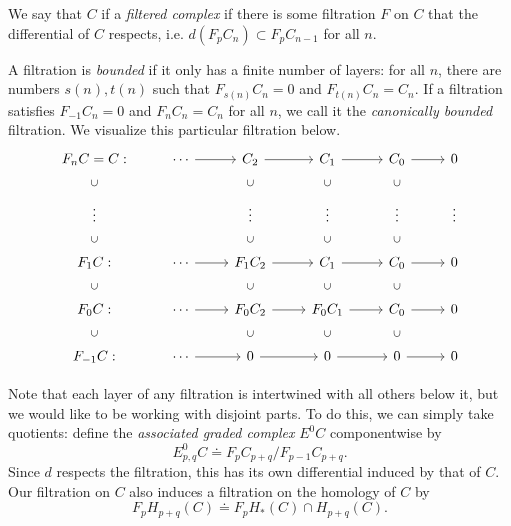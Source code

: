 \documentclass[twoside,10pt]{article}
\begin{document}
\begin{defn}[]
	We say that $C$ if a \textit{filtered complex} if there is some filtration $F$ on $C$ that the differential of $C$ respects, i.e. $d(F_{p}C_{n}) \subset F_{p}C_{n-1}$ for all $n$.
\end{defn}

A filtration is \textit{bounded} if it only has a finite number of layers: for all $n$, there are numbers $s(n), t(n)$ such that $F_{s(n)}C_{n}=0$ and $F_{t(n)}C_{n}=C_{n}$. If a filtration satisfies $F_{-1}C_n=0$ and $F_{n}C_{n}=C_{n}$ for all $n$, we call it the \textit{canonically bounded} filtration. We visualize this particular filtration below.
\[
	\begin{tikzcd}
		F_{n}C = C:&\cdots\arrow[r]&C_{2}\arrow[r]&C_1\arrow[r]&C_{0}\arrow[r]&0\\
		\vdots\arrow[draw=none]{u}[sloped,auto=false]{\subset}&&\vdots\arrow[draw=none]{u}[sloped,auto=false]{\subset}&\vdots\arrow[draw=none]{u}[sloped,auto=false]{\subset}&\vdots\arrow[draw=none]{u}[sloped,auto=false]{\subset}&\vdots\\
		F_{1}C:\arrow[draw=none]{u}[sloped,auto=false]{\subset}&\cdots\arrow[r]&F_{1}C_{2}\arrow[r]\arrow[draw=none]{u}[sloped,auto=false]{\subset}&C_1\arrow[r]\arrow[draw=none]{u}[sloped,auto=false]{\subset}&C_{0}\arrow[r]\arrow[draw=none]{u}[sloped,auto=false]{\subset}&0\\
		F_{0}C:\arrow[draw=none]{u}[sloped,auto=false]{\subset}&\cdots\arrow[r]&F_{0}C_{2}\arrow[draw=none]{u}[sloped,auto=false]{\subset}\arrow[r]&F_{0}C_1\arrow[draw=none]{u}[sloped,auto=false]{\subset}\arrow[r]&C_{0}\arrow[draw=none]{u}[sloped,auto=false]{\subset}\arrow[r]&0\\
		F_{-1}C:\arrow[draw=none]{u}[sloped,auto=false]{\subset}&\cdots\arrow[r]&0\arrow[draw=none]{u}[sloped,auto=false]{\subset}\arrow[r]&0\arrow[draw=none]{u}[sloped,auto=false]{\subset}\arrow[r]&0\arrow[draw=none]{u}[sloped,auto=false]{\subset}\arrow[r]&0
	\end{tikzcd}
\]

Note that each layer of any filtration is intertwined with all others below it, but we would like to be working with disjoint parts. To do this, we can simply take quotients: define the \textit{associated graded complex} $E^{0}C$ componentwise by
\[
	E_{p,q}^{0}C \doteq F_{p}C_{p+q}/F_{p-1}C_{p+q}.
\] Since $d$ respects the filtration, this has its own differential induced by that of $C$. Our filtration on $C$ also induces a filtration on the homology of $C$ by
\[
	F_{p}H_{p+q}(C) \doteq F_{p}H_{*}(C) \cap H_{p+q}(C).
\]
\end{document}
